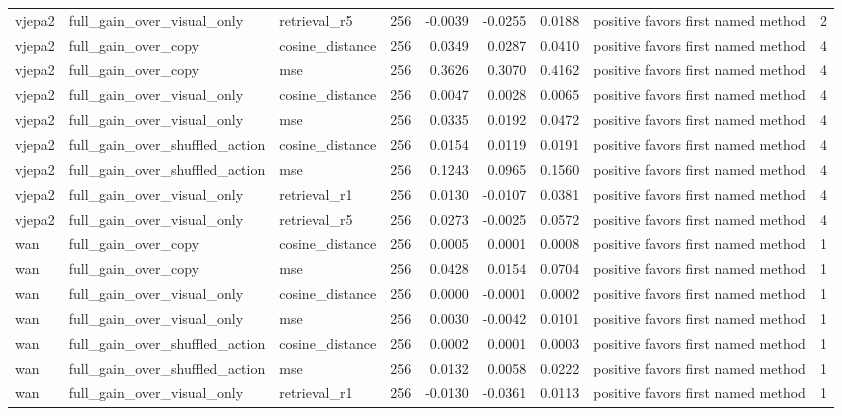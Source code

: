 \begin{tabular}{lllrrrrlr}
vjepa2 & full\_gain\_over\_visual\_only & retrieval\_r5 & 256 & -0.0039 & -0.0255 & 0.0188 & positive favors first named method & 2 \\
vjepa2 & full\_gain\_over\_copy & cosine\_distance & 256 & 0.0349 & 0.0287 & 0.0410 & positive favors first named method & 4 \\
vjepa2 & full\_gain\_over\_copy & mse & 256 & 0.3626 & 0.3070 & 0.4162 & positive favors first named method & 4 \\
vjepa2 & full\_gain\_over\_visual\_only & cosine\_distance & 256 & 0.0047 & 0.0028 & 0.0065 & positive favors first named method & 4 \\
vjepa2 & full\_gain\_over\_visual\_only & mse & 256 & 0.0335 & 0.0192 & 0.0472 & positive favors first named method & 4 \\
vjepa2 & full\_gain\_over\_shuffled\_action & cosine\_distance & 256 & 0.0154 & 0.0119 & 0.0191 & positive favors first named method & 4 \\
vjepa2 & full\_gain\_over\_shuffled\_action & mse & 256 & 0.1243 & 0.0965 & 0.1560 & positive favors first named method & 4 \\
vjepa2 & full\_gain\_over\_visual\_only & retrieval\_r1 & 256 & 0.0130 & -0.0107 & 0.0381 & positive favors first named method & 4 \\
vjepa2 & full\_gain\_over\_visual\_only & retrieval\_r5 & 256 & 0.0273 & -0.0025 & 0.0572 & positive favors first named method & 4 \\
wan & full\_gain\_over\_copy & cosine\_distance & 256 & 0.0005 & 0.0001 & 0.0008 & positive favors first named method & 1 \\
wan & full\_gain\_over\_copy & mse & 256 & 0.0428 & 0.0154 & 0.0704 & positive favors first named method & 1 \\
wan & full\_gain\_over\_visual\_only & cosine\_distance & 256 & 0.0000 & -0.0001 & 0.0002 & positive favors first named method & 1 \\
wan & full\_gain\_over\_visual\_only & mse & 256 & 0.0030 & -0.0042 & 0.0101 & positive favors first named method & 1 \\
wan & full\_gain\_over\_shuffled\_action & cosine\_distance & 256 & 0.0002 & 0.0001 & 0.0003 & positive favors first named method & 1 \\
wan & full\_gain\_over\_shuffled\_action & mse & 256 & 0.0132 & 0.0058 & 0.0222 & positive favors first named method & 1 \\
wan & full\_gain\_over\_visual\_only & retrieval\_r1 & 256 & -0.0130 & -0.0361 & 0.0113 & positive favors first named method & 1 \\

\end{tabular}
